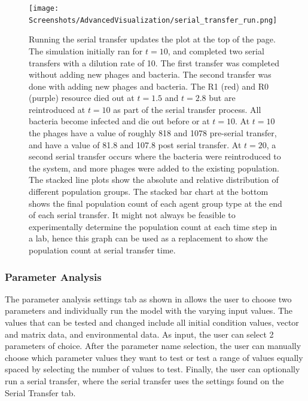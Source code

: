 \begin{figure}
    \centering
    \texttt{[image: Screenshots/AdvancedVisualization/serial\_transfer\_run.png]}
    \caption{
        Running the serial transfer updates the plot at the top of the page. 
        The simulation initially ran for $t=10$, and completed two serial transfers with a dilution rate of 10. 
        The first transfer was completed without adding new phages and bacteria. 
        The second transfer was done with adding new phages and bacteria. 
        The R1 (red) and R0 (purple) resource died out at $t=1.5$ and $t=2.8$ but are reintroduced at $t=10$ as part of the serial transfer process. 
        All bacteria become infected and die out before or at $t=10$. 
        At $t=10$ the phages have a value of roughly 818 and 1078 pre-serial transfer, and have a value of 81.8 and 107.8 post serial transfer. 
        At $t=20$, a second serial transfer occurs where the bacteria were reintroduced to the system, and more phages were added to the existing population. 
        The stacked line plots show the absolute and relative distribution of different population groups. 
        The stacked bar chart at the bottom shows the final population count of each agent group type at the end of each serial transfer. 
        It might not always be feasible to experimentally determine the population count at each time step in a lab, hence this graph can be used as a replacement to show the population count at serial transfer time. 
    }
    \label{fig:ss:av:serial_transfer_run}
\end{figure}

\subsubsection{Parameter Analysis}
The parameter analysis settings tab as shown in  allows the user to choose two parameters and individually run the model with the varying input values. 
The values that can be tested and changed include all initial condition values, vector and matrix data, and environmental data. 
As input, the user can select 2 parameters of choice. 
After the parameter name selection, the user can manually choose which parameter values they want to test or test a range of values equally spaced by selecting the number of values to test. 
Finally, the user can optionally run a serial transfer, where the serial transfer uses the settings found on the Serial Transfer tab. \newline 

